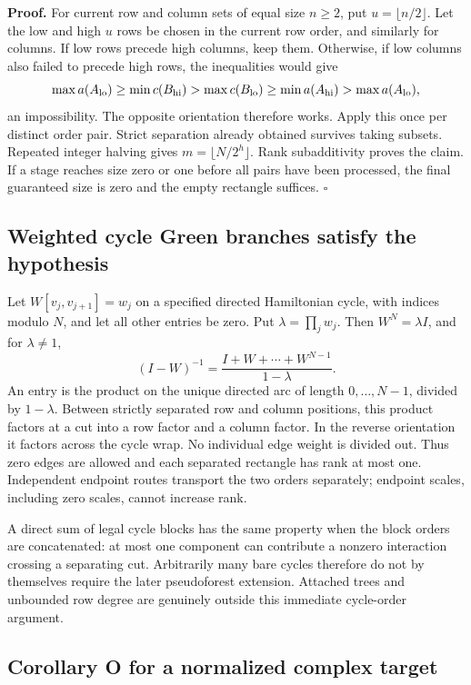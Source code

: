 \documentclass[
  11pt,
]{article}
\begin{document}
\textbf{Proof.} For current row and column sets of equal size \(n\ge2\),
put \(u=\lfloor n/2\rfloor\). Let the low and high \(u\) rows be chosen
in the current row order, and similarly for columns. If low rows precede
high columns, keep them. Otherwise, if low columns also failed to
precede high rows, the inequalities would give \[
 \max a(A_{\rm lo})\ge\min c(B_{\rm hi})
 >\max c(B_{\rm lo})\ge\min a(A_{\rm hi})
 >\max a(A_{\rm lo}),
\] an impossibility. The opposite orientation therefore works. Apply
this once per distinct order pair. Strict separation already obtained
survives taking subsets. Repeated integer halving gives
\(m=\lfloor N/2^h\rfloor\). Rank subadditivity proves the claim. If a
stage reaches size zero or one before all pairs have been processed, the
final guaranteed size is zero and the empty rectangle suffices.
\(\square\)

\subsection{Weighted cycle Green branches satisfy the
hypothesis}\label{weighted-cycle-green-branches-satisfy-the-hypothesis}

Let \(W[v_j,v_{j+1}]=w_j\) on a specified directed Hamiltonian cycle,
with indices modulo \(N\), and let all other entries be zero. Put
\(\lambda=\prod_jw_j\). Then \(W^N=\lambda I\), and for \(\lambda\ne1\),
\[
 (I-W)^{-1}=\frac{I+W+\cdots+W^{N-1}}{1-\lambda}.
\] An entry is the product on the unique directed arc of length
\(0,\ldots,N-1\), divided by \(1-\lambda\). Between strictly separated
row and column positions, this product factors at a cut into a row
factor and a column factor. In the reverse orientation it factors across
the cycle wrap. No individual edge weight is divided out. Thus zero
edges are allowed and each separated rectangle has rank at most one.
Independent endpoint routes transport the two orders separately;
endpoint scales, including zero scales, cannot increase rank.

A direct sum of legal cycle blocks has the same property when the block
orders are concatenated: at most one component can contribute a nonzero
interaction crossing a separating cut. Arbitrarily many bare cycles
therefore do not by themselves require the later pseudoforest extension.
Attached trees and unbounded row degree are genuinely outside this
immediate cycle-order argument.

\subsection{Corollary O for a normalized complex
target}\label{corollary-o-for-a-normalized-complex-target}
\end{document}
